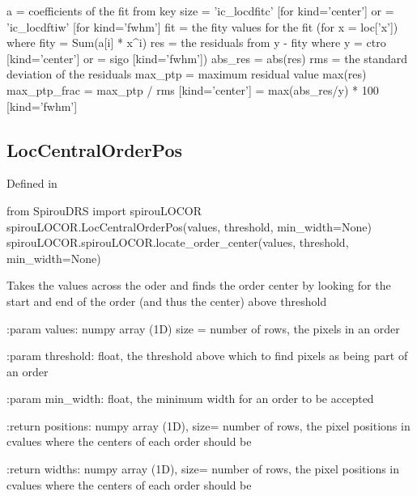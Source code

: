 \begin{minipage}{\textwidth}
\begin{pythondocstring}
        a = coefficients of the fit from key
        size = 'ic_locdfitc' [for kind='center'] or
             = 'ic_locdftiw' [for kind='fwhm']
        fit = the fity values for the fit (for x = loc['x'])
            where fity = Sum(a[i] * x^i)
        res = the residuals from y - fity
             where y = ctro [kind='center'] or 
                     = sigo [kind='fwhm'])
        abs_res = abs(res)
        rms = the standard deviation of the residuals
        max_ptp = maximum residual value max(res)
        max_ptp_frac = max_ptp / rms  [kind='center']
                     = max(abs_res/y) * 100   [kind='fwhm']
\end{pythondocstring}
\end{minipage}

\begin{minipage}{\textwidth}
\subsection{LocCentralOrderPos}

Defined in \spirouLOCOR{}

\begin{pythonbox}
from SpirouDRS import spirouLOCOR
spirouLOCOR.LocCentralOrderPos(values, threshold, min_width=None)
spirouLOCOR.spirouLOCOR.locate_order_center(values, threshold, min_width=None)
\end{pythonbox}

\begin{pythondocstring}
Takes the values across the oder and finds the order center by looking for
the start and end of the order (and thus the center) above threshold

:param values: numpy array (1D) size = number of rows, the pixels in an
                order

:param threshold: float, the threshold above which to find pixels as being
                  part of an order

:param min_width: float, the minimum width for an order to be accepted

:return positions: numpy array (1D), size= number of rows,
                   the pixel positions in cvalues where the centers of each
                   order should be

:return widths:    numpy array (1D), size= number of rows,
                   the pixel positions in cvalues where the centers of each
                   order should be
\end{pythondocstring}
\end{minipage}


